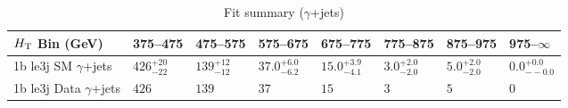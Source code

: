 \documentclass[8pt]{article}
\def\scalht{\mbox{$H_{\rm{T}}$}\xspace}
\newcommand\T{\rule{0pt}{2.6ex}}
\begin{document}
\begin{table}[ht!]
\caption{Fit summary ($\gamma$+jets)}
\label{tab:ensemble-summary}
\centering
\begin{tabular}{ llllllll }

\hline
\scalht Bin (GeV)       & 375--475                       & 475--575                       & 575--675                       & 675--775                       & 775--875                       & 875--975                       & 975--$\infty$                  \\ [1.000000ex]
\hline
1b le3j SM $\gamma$+jets\T & $426^{+20}_{-22}$              & $139^{+12}_{-12}$              & $37.0^{+6.0}_{-6.2}$           & $15.0^{+3.9}_{-4.1}$           & $3.0^{+2.0}_{-2.0}$            & $5.0^{+2.0}_{-2.0}$            & $0.0^{+0.0}_{--0.0}$           \\ 
1b le3j Data $\gamma$+jets\T & $426$                          & $139$                          & $37$                           & $15$                           & $3$                            & $5$                            & $0$                            \\ 
\hline

\end{tabular}
\end{table}
\end{document}
